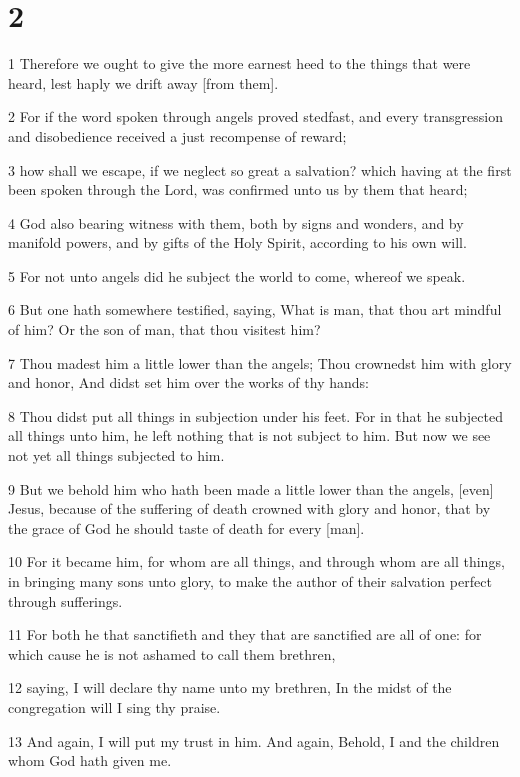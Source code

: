 \chapter{2}

\par 1 Therefore we ought to give the more earnest heed to the things that were heard, lest haply we drift away [from them].
\par 2 For if the word spoken through angels proved stedfast, and every transgression and disobedience received a just recompense of reward;
\par 3 how shall we escape, if we neglect so great a salvation? which having at the first been spoken through the Lord, was confirmed unto us by them that heard;
\par 4 God also bearing witness with them, both by signs and wonders, and by manifold powers, and by gifts of the Holy Spirit, according to his own will.
\par 5 For not unto angels did he subject the world to come, whereof we speak.
\par 6 But one hath somewhere testified, saying, What is man, that thou art mindful of him? Or the son of man, that thou visitest him?
\par 7 Thou madest him a little lower than the angels; Thou crownedst him with glory and honor, And didst set him over the works of thy hands:
\par 8 Thou didst put all things in subjection under his feet. For in that he subjected all things unto him, he left nothing that is not subject to him. But now we see not yet all things subjected to him.
\par 9 But we behold him who hath been made a little lower than the angels, [even] Jesus, because of the suffering of death crowned with glory and honor, that by the grace of God he should taste of death for every [man].
\par 10 For it became him, for whom are all things, and through whom are all things, in bringing many sons unto glory, to make the author of their salvation perfect through sufferings.
\par 11 For both he that sanctifieth and they that are sanctified are all of one: for which cause he is not ashamed to call them brethren,
\par 12 saying, I will declare thy name unto my brethren, In the midst of the congregation will I sing thy praise.
\par 13 And again, I will put my trust in him. And again, Behold, I and the children whom God hath given me.

